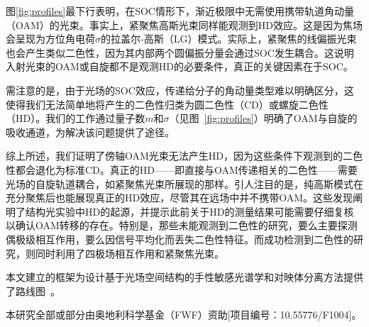 \documentclass[reprint,aps,prl,twocolumn,superscriptaddress,groupedaddress]{revtex4-2}
\begin{document}
\begin{CJK*}{UTF8}{gbsn}
图\ref{fig:profiles}最下行表明，在SOC情形下，渐近极限中无需使用携带轨道角动量（OAM）的光束。事实上，紧聚焦高斯光束同样能观测到HD效应。这是因为焦场会呈现为方位角电荷$\sigma$的拉盖尔-高斯（LG）模式。实际上，紧聚焦的线偏振光束也会产生类似二色性，因为其内部两个圆偏振分量会通过SOC发生耦合。这说明入射光束的OAM或自旋都不是观测HD的必要条件，真正的关键因素在于SOC。

需注意的是，由于光场的SOC效应，传递给分子的角动量类型难以明确区分，这使得我们无法简单地将产生的二色性归类为圆二色性（CD）或螺旋二色性（HD）。我们的工作通过量子数$m$和$\sigma$（见图~\ref{fig:profiles}）明确了OAM与自旋的吸收通道，为解决该问题提供了途径。

综上所述，我们证明了傍轴OAM光束无法产生HD，因为这些条件下观测到的二色性都会退化为标准CD。真正的HD——即直接与OAM传递相关的二色性——需要光场的自旋轨道耦合，如紧聚焦光束所展现的那样。引人注目的是，纯高斯模式在充分聚焦后也能展现真正的HD效应，尽管其在远场中并不携带OAM。这些发现阐明了结构光实验中HD的起源，并提示此前关于HD的测量结果可能需要仔细复核以确认OAM转移的存在。特别是，那些未能观测到二色性的研究，要么主要探测偶极级相互作用\cite{Araoka2005}，要么因信号平均化而丢失二色性特征\cite{Loeffler2011}。而成功检测到二色性的研究，则同时利用了四极场相互作用和紧聚焦光束\cite{Rusak2019,Rouxel2022,Begin2023,Jain2023}。

本文建立的框架为设计基于光场空间结构的手性敏感光谱学和对映体分离方法提供了路线图~\cite{Leibscher2022}。\\
\begin{acknowledgments}
本研究全部或部分由奥地利科学基金（FWF）资助[项目编号：10.55776/F1004]。
\end{acknowledgments}

\end{CJK*}
\end{document}
